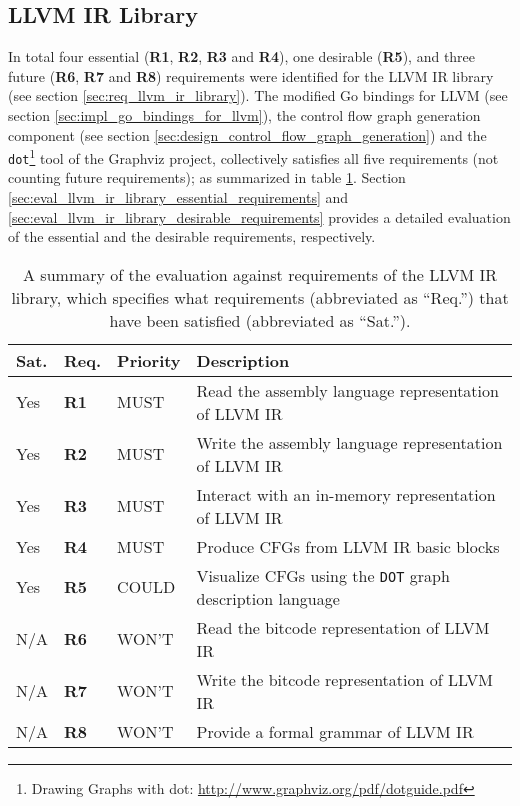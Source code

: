 
\subsection{LLVM IR Library}

In total four essential (\textbf{R1}, \textbf{R2}, \textbf{R3} and \textbf{R4}), one desirable (\textbf{R5}), and three future (\textbf{R6}, \textbf{R7} and \textbf{R8}) requirements were identified for the LLVM IR library (see section \ref{sec:req_llvm_ir_library}). The modified Go bindings for LLVM (see section \ref{sec:impl_go_bindings_for_llvm}), the control flow graph generation component (see section \ref{sec:design_control_flow_graph_generation}) and the \texttt{dot}\footnote{Drawing Graphs with dot: \url{http://www.graphviz.org/pdf/dotguide.pdf}} tool of the Graphviz project, collectively satisfies all five requirements (not counting future requirements); as summarized in table \ref{tbl:eval_summary_of_llvm_ir_library}. Section \ref{sec:eval_llvm_ir_library_essential_requirements} and \ref{sec:eval_llvm_ir_library_desirable_requirements} provides a detailed evaluation of the essential and the desirable requirements, respectively.

\begin{table}[htbp]
	\begin{center}
		\begin{tabular}{|l|l|l|l|}
			\hline
			Sat. & Req. & Priority & Description \\
			\hline
			\rowcolor{light_green_3}
			Yes & \textbf{R1} & MUST & Read the assembly language representation of LLVM IR \\
			\rowcolor{light_green_3}
			Yes & \textbf{R2} & MUST & Write the assembly language representation of LLVM IR \\
			\rowcolor{light_green_3}
			Yes & \textbf{R3} & MUST & Interact with an in-memory representation of LLVM IR \\
			\rowcolor{light_green_3}
			Yes & \textbf{R4} & MUST & Produce CFGs from LLVM IR basic blocks \\
			\hline
			\rowcolor{light_green_3}
			Yes & \textbf{R5} & COULD & Visualize CFGs using the \texttt{DOT} graph description language \\
			\hline
			N/A & \textbf{R6} & WON'T & Read the bitcode representation of LLVM IR \\
			N/A & \textbf{R7} & WON'T & Write the bitcode representation of LLVM IR \\
			N/A & \textbf{R8} & WON'T & Provide a formal grammar of LLVM IR \\
			\hline
		\end{tabular}
	\end{center}
	\caption{A summary of the evaluation against requirements of the LLVM IR library, which specifies what requirements (abbreviated as ``Req.'') that have been satisfied (abbreviated as ``Sat.'').}
	\label{tbl:eval_summary_of_llvm_ir_library}
\end{table}




